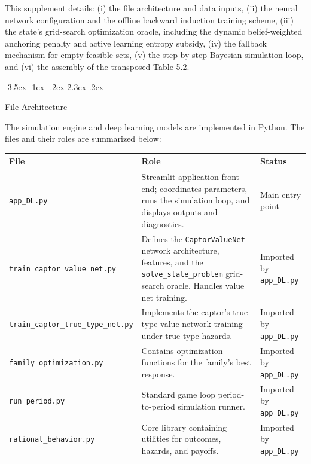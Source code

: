 \documentclass[12pt]{article}
\makeatletter
\newcommand{\pyfile}[1]{\texttt{#1}}
\newcommand{\pyvar}[1]{\texttt{#1}}
\numberwithin{equation}{section}
\numberwithin{table}{section}
\renewcommand\section{\@startsection {section}{1}{\z@}%
                                   {-3.5ex \@plus -1ex \@minus -.2ex}%
                                   {2.3ex \@plus.2ex}%
                                   {\normalfont\Large\bfseries\raggedright}}
\makeatother
\begin{document}
This supplement details: (i) the file architecture and data inputs, (ii) the neural network configuration and the offline backward induction training scheme, (iii) the state's grid-search optimization oracle, including the dynamic belief-weighted anchoring penalty and active learning entropy subsidy, (iv) the fallback mechanism for empty feasible sets, (v) the step-by-step Bayesian simulation loop, and (vi) the assembly of the transposed Table 5.2.

\section{File Architecture}

The simulation engine and deep learning models are implemented in Python. The files and their roles are summarized below:

\begin{center}
\footnotesize
\begin{tabularx}{\textwidth}{@{}l X l@{}}
\toprule
\textbf{File} & \textbf{Role} & \textbf{Status} \\
\midrule
\pyfile{app\_DL.py} & Streamlit application front-end; coordinates parameters, runs the simulation loop, and displays outputs and diagnostics. & Main entry point \\
\pyfile{train\_captor\_value\_net.py} & Defines the \pyvar{CaptorValueNet} network architecture, features, and the \pyvar{solve\_state\_problem} grid-search oracle. Handles value net training. & Imported by \pyfile{app\_DL.py} \\
\pyfile{train\_captor\_true\_type\_net.py} & Implements the captor's true-type value network training under true-type hazards. & Imported by \pyfile{app\_DL.py} \\
\pyfile{family\_optimization.py} & Contains optimization functions for the family's best response. & Imported by \pyfile{app\_DL.py} \\
\pyfile{run\_period.py} & Standard game loop period-to-period simulation runner. & Imported by \pyfile{app\_DL.py} \\
\pyfile{rational\_behavior.py} & Core library containing utilities for outcomes, hazards, and payoffs. & Imported by \pyfile{app\_DL.py} \\
\bottomrule
\end{tabularx}
\normalsize
\end{center}
\end{document}
